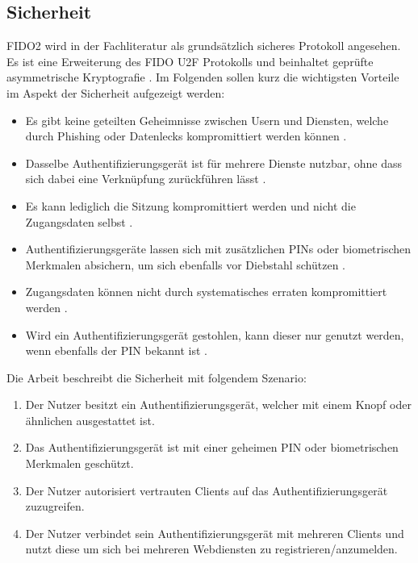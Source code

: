 \subsection{Sicherheit}

\ac{FIDO}2 wird in der Fachliteratur als grundsätzlich sicheres Protokoll angesehen. Es ist eine Erweiterung des \ac{FIDO} \ac{U2F} Protokolls und beinhaltet geprüfte asymmetrische Kryptografie \cite{lyastani2020fido2} \cite{farke2020you}. Im Folgenden sollen kurz die wichtigsten Vorteile im Aspekt der Sicherheit aufgezeigt werden:


\begin{itemize}
    \item Es gibt keine geteilten Geheimnisse zwischen Usern und Diensten, welche durch Phishing oder Datenlecks kompromittiert werden können \cite{lyastani2020fido2} \cite{farke2020you}. 
    \item Dasselbe Authentifizierungsgerät ist für mehrere Dienste nutzbar, ohne dass sich dabei eine Verknüpfung zurückführen lässt \cite{lyastani2020fido2} \cite{farke2020you}.
    \item Es kann lediglich die Sitzung kompromittiert werden und nicht die Zugangsdaten selbst \cite{morii2017research}.
    \item Authentifizierungsgeräte lassen sich mit zusätzlichen PINs oder biometrischen Merkmalen absichern, um sich ebenfalls vor Diebstahl schützen \cite{barbosa2021provable}.
    \item Zugangsdaten können nicht durch systematisches erraten kompromittiert werden \cite{barbosa2021provable}.
    \item Wird ein Authentifizierungsgerät gestohlen, kann dieser nur genutzt werden, wenn ebenfalls der PIN bekannt ist \cite{barbosa2021provable}.
\end{itemize}

Die Arbeit \cite{barbosa2021provable} beschreibt die Sicherheit mit folgendem Szenario:

\begin{enumerate}
    \item Der Nutzer besitzt ein Authentifizierungsgerät, welcher mit einem Knopf oder ähnlichen ausgestattet ist.
    \item Das Authentifizierungsgerät ist mit einer geheimen PIN oder biometrischen Merkmalen geschützt.
    \item Der Nutzer autorisiert vertrauten Clients auf das Authentifizierungsgerät zuzugreifen.
    \item Der Nutzer verbindet sein Authentifizierungsgerät mit mehreren Clients und nutzt diese um sich bei mehreren Webdiensten zu registrieren/anzumelden.
\end{enumerate}

